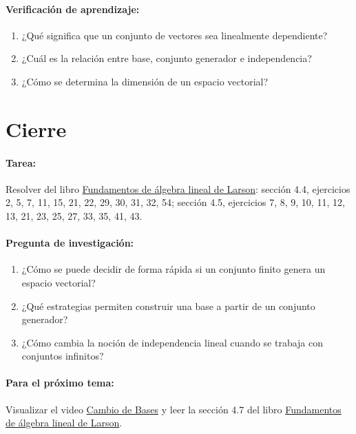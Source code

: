 \documentclass[a4,11pt]{aleph-notas}
\begin{document}
\paragraph{Verificación de aprendizaje:}
\begin{enumerate}[leftmargin=*]
    \item ¿Qué significa que un conjunto de vectores sea linealmente dependiente?
    \item ¿Cuál es la relación entre base, conjunto generador e independencia?
    \item ¿Cómo se determina la dimensión de un espacio vectorial?
\end{enumerate}

\section*{Cierre}

\paragraph{Tarea:}
Resolver del libro \href{https://catalogobiblioteca.puce.edu.ec/cgi-bin/koha/opac-detail.pl?biblionumber=86081}{Fundamentos de álgebra lineal de Larson}: sección 4.4, ejercicios 2, 5, 7, 11, 15, 21, 22, 29, 30, 31, 32, 54; sección 4.5, ejercicios 7, 8, 9, 10, 11, 12, 13, 21, 23, 25, 27, 33, 35, 41, 43.

\paragraph{Pregunta de investigación:}
\begin{enumerate}[leftmargin=*]
    \item ¿Cómo se puede decidir de forma rápida si un conjunto finito genera un espacio vectorial?
    \item ¿Qué estrategias permiten construir una base a partir de un conjunto generador?
    \item ¿Cómo cambia la noción de independencia lineal cuando se trabaja con conjuntos infinitos?
\end{enumerate}

\paragraph{Para el próximo tema:}  
Visualizar el video \href{https://youtu.be/LYlaRDsi_T8?si=3zNWorDZfwZVS3Eq}{Cambio de Bases} y leer la sección 4.7 del libro \href{https://catalogobiblioteca.puce.edu.ec/cgi-bin/koha/opac-detail.pl?biblionumber=86081}{Fundamentos de álgebra lineal de Larson}.
\end{document}

